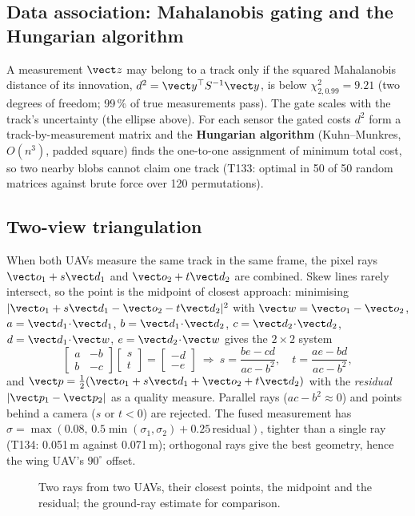 \subsection{Data association: Mahalanobis gating and the Hungarian algorithm}
A measurement $\vect z$ may belong to a track only if the squared Mahalanobis distance of its innovation, $d^2=\vect y^\top S^{-1}\vect y$, is below $\chi^2_{2,0.99}=9.21$ (two degrees of freedom; 99\,\% of true measurements pass). The gate scales with the track's uncertainty (the ellipse above). For each sensor the gated costs $d^2$ form a track-by-measurement matrix and the \textbf{Hungarian algorithm}
(Kuhn--Munkres, $O(n^3)$, padded square) finds the one-to-one assignment of minimum total cost, so two nearby blobs cannot claim one track (T133: optimal in 50 of 50 random matrices against brute force over 120 permutations).
\lstMahal
\lstHungarian

\subsection{Two-view triangulation}
When both UAVs measure the same track in the same frame, the pixel rays $\vect o_1+s\vect d_1$ and $\vect o_2+t\vect d_2$ are combined. Skew lines rarely intersect, so the point is the midpoint of closest approach: minimising $|\vect o_1+s\vect d_1-\vect o_2-t\vect d_2|^2$ with
$\vect w=\vect o_1-\vect o_2$, $a=\vect d_1\!\cdot\!\vect d_1$, $b=\vect d_1\!\cdot\!\vect d_2$, $c=\vect d_2\!\cdot\!\vect d_2$, $d=\vect d_1\!\cdot\!\vect w$, $e=\vect d_2\!\cdot\!\vect w$ gives the $2\times2$ system
\begin{equation}
\begin{bmatrix}a&-b\\b&-c\end{bmatrix}\begin{bmatrix}s\\t\end{bmatrix}=\begin{bmatrix}-d\\-e\end{bmatrix}
\ \Rightarrow\ s=\frac{be-cd}{ac-b^2},\quad t=\frac{ae-bd}{ac-b^2},
\end{equation}
and $\vect p=\tfrac12(\vect o_1+s\vect d_1+\vect o_2+t\vect d_2)$ with the \emph{residual} $|\vect p_1-\vect p_2|$ as a quality measure. Parallel rays ($ac-b^2\approx0$) and points behind a camera ($s$ or $t<0$) are rejected.
The fused measurement has $\sigma=\max(0.08,\,0.5\min(\sigma_1,\sigma_2)+0.25\,\text{residual})$, tighter than a single ray (T134: 0.051\,m against 0.071\,m); orthogonal rays give the best geometry, hence the wing UAV's $90^\circ$ offset.
\lstTriangulate
\begin{figure}[h]
\centering
{}
\caption{Two rays from two UAVs, their closest points, the midpoint and the residual; the ground-ray estimate for comparison.}
\end{figure}

